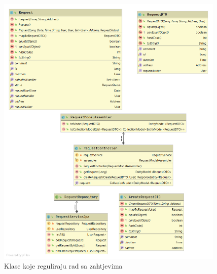 				\begin{figure}[H]
					\includegraphics[scale=0.38]{slike/cs3.png} %
					\centering
					\caption{Klase koje reguliraju rad sa zahtjevima}
					
				\end{figure}
			
				\newpage
				
